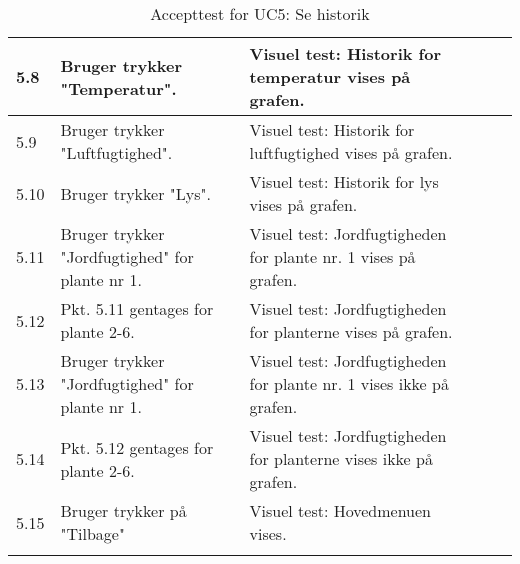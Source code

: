 \begin{longtable}{| l | >{\raggedright}X | >{\raggedright}X | >{\raggedright}X | >{\raggedright\arraybackslash}p{2.3cm} |}
    5.8 & Bruger trykker "Temperatur".                                                     & Visuel test: Historik for temperatur vises på grafen.            & ~        & ~                  \\ \hline
    5.9 & Bruger trykker "Luftfugtighed".                                                   & Visuel test: Historik for luftfugtighed vises på grafen. & ~        & ~                  \\ \hline
    5.10 & Bruger trykker "Lys".                                                            & Visuel test: Historik for lys vises på grafen.                         & ~        & ~                  \\ \hline
    5.11 & Bruger trykker "Jordfugtighed" for plante nr 1. & Visuel test: Jordfugtigheden for plante nr. 1 vises på grafen. & ~        & ~                  \\ \hline
    5.12 & Pkt. 5.11 gentages for plante 2-6. &Visuel test: Jordfugtigheden for planterne vises på grafen.&&\\\hline
    5.13 & Bruger trykker "Jordfugtighed" for plante nr 1.  & Visuel test: Jordfugtigheden for plante nr. 1 vises ikke på grafen. & ~        & ~                  \\ \hline
    5.14 & Pkt. 5.12 gentages for plante 2-6. &Visuel test: Jordfugtigheden for planterne vises ikke på grafen.&&\\\hline
    5.15 & Bruger trykker på "Tilbage" & Visuel test: Hovedmenuen vises. & ~        & ~                  \\ \hline
	\caption{Accepttest for UC5: Se historik}\label{tbl:acceptUC5}
\end{longtable}